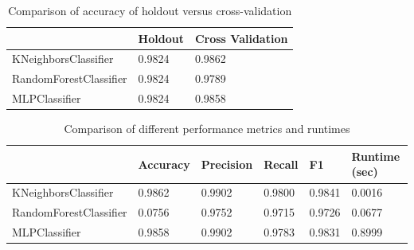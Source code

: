 \begin{table}[H]
\begin{center}
\begin{tabular}{|l|l|l|}
\hline
                       & Holdout & Cross Validation \\ \hline
KNeighborsClassifier   & 0.9824  & 0.9862           \\ \hline
RandomForestClassifier & 0.9824  & 0.9789           \\ \hline
MLPClassifier          & 0.9824  & 0.9858           \\ \hline
\end{tabular}
\caption{Comparison of accuracy of holdout versus cross-validation}
\end{center}
\end{table}

\begin{table}[H]
\begin{center}
\begin{tabular}{|l|l|l|l|l|l|}
\hline
                       & Accuracy & Precision & Recall & F1     & Runtime (sec) \\ \hline
KNeighborsClassifier   & 0.9862   & 0.9902    & 0.9800 & 0.9841 & 0.0016        \\ \hline
RandomForestClassifier & 0.0756   & 0.9752    & 0.9715 & 0.9726 & 0.0677        \\ \hline
MLPClassifier          & 0.9858   & 0.9902    & 0.9783 & 0.9831 & 0.8999        \\ \hline
\end{tabular}
\caption{Comparison of different performance metrics and runtimes}
\end{center}
\end{table}

